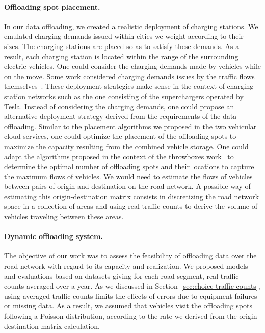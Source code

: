 \paragraph{Offloading spot placement.}
In our data offloading, we created a realistic deployment of charging stations. We emulated charging demands issued within cities we weight according to their sizes. The charging stations are placed so as
to satisfy these demands. As a result, each charging station is located within the range of the surrounding electric vehicles. One could consider the charging demands made by vehicles while on the move. Some work considered charging demands issues by the traffic flows themselves~\cite{hodgson1990flow}. These deployment strategies make sense in the context of charging station networks such as the one consisting of the superchargers operated by Tesla. 
Instead of considering the charging demands, one could propose an alternative deployment strategy derived from the requirements of the data offloading. Similar to the placement algorithms we proposed in the two vehicular cloud services, one could optimize the placement of the offloading spots to maximize the capacity resulting from the combined vehicle storage. One could adapt the algorithms proposed in the context of the throwboxes work~\cite{zhao2006capacity} to determine the optimal number of offloading spots and their locations to capture the maximum flows of vehicles. We would need to estimate the flows of vehicles between pairs of origin and destination on the road network. A possible way of estimating this origin-destination matrix consists in discretizing the road network space in a collection of areas and using real traffic counts to derive the volume of vehicles traveling between these areas.

\paragraph{Dynamic offloading system.}
The objective of our work was to assess the feasibility of offloading data over the road network with regard to its capacity and realization. We proposed models and evaluations based on datasets giving for each road segment, real traffic counts averaged over a year. As we discussed in Section~\ref{sec:choice-traffic-counts}, using averaged traffic counts limits the effects of errors due to equipment failures or missing data. As a result, we assumed that vehicles visit the offloading spots following a Poisson distribution, according to the rate we derived from the origin-destination matrix calculation. 

